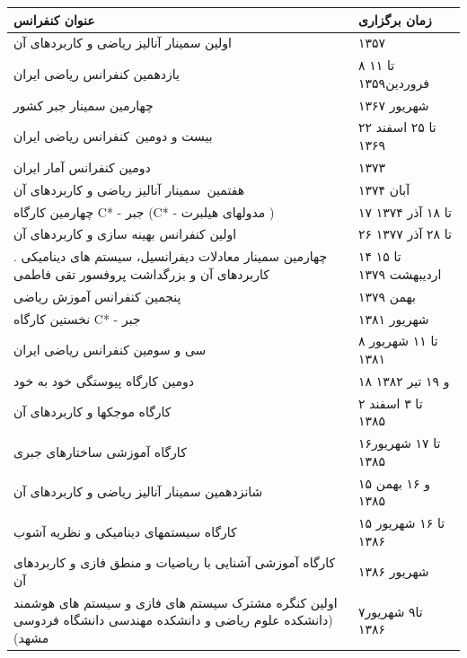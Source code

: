 \documentclass[
  letterpaper,
  DIV=11,
  numbers=noendperiod]{scrreprt}
\newcounter{none} %
\begin{document}
{\def\LTcaptype{none} %
\begin{longtable}[]{@{}
  >{\raggedright\arraybackslash}p{}
  >{\raggedright\arraybackslash}p{}@{}}
\toprule\noalign{}
\begin{minipage}[b]{\linewidth}\raggedright
عنوان کنفرانس
\end{minipage} & \begin{minipage}[b]{\linewidth}\raggedright
زمان برگزاری
\end{minipage} \\
\midrule\noalign{}
\endhead
\bottomrule\noalign{}
\endlastfoot
اولین سمینار آنالیز ریاضی و کاربردهای آن & ۱۳۵۷ \\
یازدهمین کنفرانس ریاضی ایران & ۸ تا ۱۱ فروردین‌۱۳۵۹ \\
چهارمین سمینار جبر کشور & شهریور ۱۳۶۷ \\
بیست و دومین~کنفرانس ریاضی ایران & ۲۲ تا ۲۵ اسفند ۱۳۶۹ \\
دومین کنفرانس آمار ایران & ۱۳۷۳ \\
هفتمین~سمینار آنالیز ریاضی و کاربردهای آن & آبان ۱۳۷۴ \\
چهارمین کارگاه C* - جبر (C* - مدولهای هیلبرت ) & ۱۷ تا ۱۸ آذر ۱۳۷۴ \\
اولین کنفرانس بهینه سازی و کاربردهای آن & ۲۶ تا ۲۸ آذر ۱۳۷۷ \\
چهارمین سمینار معادلات دیفرانسیل، سیستم های دینامیکی . کاربردهای آن و
بزرگداشت پروفسور تقی فاطمی & ۱۴ تا ۱۵ اردیبهشت ۱۳۷۹ \\
پنجمین کنفرانس آموزش ریاضی & بهمن ۱۳۷۹ \\
نخستین کارگاه C* - جبر & شهریور ۱۳۸۱ \\
سی و سومین کنفرانس ریاضی ایران & ۸ تا ۱۱ شهریور ۱۳۸۱ \\
دومین کارگاه پیوستگی خود به خود & ۱۸ و ۱۹ تیر ۱۳۸۲ \\
کارگاه موجکها و کاربردهای آن & ۲ تا ۳ اسفند ۱۳۸۵ \\
کارگاه آموزشی ساختارهای جبری & ۱۶تا ۱۷ شهریور ۱۳۸۵ \\
شانزدهمین سمینار آنالیز ریاضی و کاربردهای آن & ۱۵ و ۱۶ بهمن ۱۳۸۵ \\
کارگاه سیستمهای دینامیکی و نظریه آشوب & ۱۵ تا ۱۶ شهریور ۱۳۸۶ \\
کارگاه آموزشی آشنایی با ریاضیات و منطق فازی و کاربردهای آن & شهریور
۱۳۸۶ \\
اولین کنگره مشترک سیستم های فازی و سیستم های هوشمند (دانشکده علوم ریاضی
و دانشکده مهندسی دانشگاه فردوسی مشهد) & ۷تا۹ شهریور ۱۳۸۶ \\

\end{longtable}}
\end{document}
